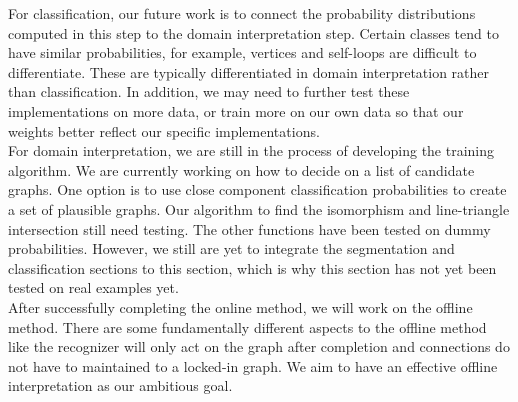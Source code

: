 For classification, our future work is to connect the probability distributions computed in this step to the domain interpretation step. Certain classes tend to have similar probabilities, for example, vertices and self-loops are difficult to differentiate. These are typically differentiated in domain interpretation rather than classification. In addition, we may need to further test these implementations on more data, or train more on our own data so that our weights better reflect our specific implementations.\\

For domain interpretation, we are still in the process of developing the training algorithm. We are currently working on how to decide on a list of candidate graphs. One option is to use close component classification probabilities to create a set of plausible graphs. Our algorithm to find the isomorphism and line-triangle intersection still need testing. The other functions have been tested on dummy probabilities. However, we still are yet to integrate the segmentation and classification sections to this section, which is why this section has not yet been tested on real examples yet.\\

After successfully completing the online method, we will work on the offline method. There are some fundamentally different aspects to the offline method like the recognizer will only act on the graph after completion and connections do not have to maintained to a locked-in graph. We aim to have an effective offline interpretation as our ambitious goal.\\